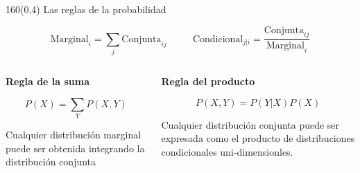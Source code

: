 \documentclass[shownotes,aspectratio=169]{beamer}
\begin{document}
\begin{frame}[plain]
\begin{textblock}{160}(0,4)
\centering \LARGE  Las reglas de la probabilidad
\end{textblock}


\vspace{0.75cm}



\begin{equation*}
  \text{Marginal}_{i} = \sum_j \text{Conjunta}_{ij}  \ \ \ \ \ \ \ \ \ \ \ \  \text{Condicional}_{j|i} = \frac{\text{Conjunta}_{ij}}{\text{Marginal}_{i}}
\end{equation*}

\pause
\vspace{0.75cm}


\begin{columns}[t]
\begin{column}{0.5\textwidth}
 \centering \textbf{Regla de la suma}
 
 
\begin{equation*}
 P(X) = \sum_Y P(X,Y)
\end{equation*}
 
 \justifying \footnotesize
  Cualquier distribución marginal puede ser obtenida integrando la distribución conjunta

 \end{column}
 \begin{column}{0.5\textwidth}
\centering  \textbf{Regla del producto}

\begin{equation*}
 P(X,Y) = P(Y|X) P(X)
\end{equation*}

 \justifying \footnotesize
Cualquier distribución conjunta puede ser expresada como el producto de distribuciones condicionales uni-dimensionles.

\end{column}
\end{columns}

\end{frame}
\end{document}
